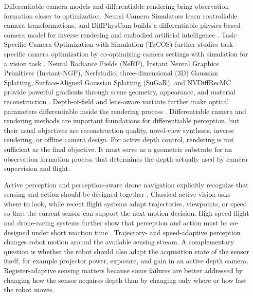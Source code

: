 \documentclass[letterpaper,journal]{IEEEtran}
\begin{document}
Differentiable camera models and differentiable rendering bring observation
formation closer to optimization. Neural Camera Simulators learn controllable
camera transformations, and DiffPhysCam builds a differentiable physics-based
camera model for inverse rendering and embodied artificial intelligence
\cite{ouyangNeuralCameraSimulators2021,chenDiffPhysCamDifferentiablePhysicsBased2025b}.
Task-Specific Camera Optimization with Simulation (TaCOS) further studies
task-specific camera optimization by co-optimizing camera settings with
simulation for a vision task
\cite{yanTaCOS2024}. Neural Radiance Fields (NeRF), Instant Neural Graphics
Primitives (Instant-NGP), Nerfstudio, three-dimensional (3D) Gaussian
Splatting, Surface-Aligned Gaussian Splatting (SuGaR), and NVDiffRecMC provide
powerful gradients through scene geometry, appearance, and material
reconstruction
\cite{mildenhallNeRF2020,mullerInstantNGP2022,tancikNerfstudio2023,kerblGaussianSplatting2023,guedonSuGaR2024,hasselgrenNVDiffRecMC2022}.
Depth-of-field and lens-aware variants further make optical parameters
differentiable inside the rendering process
\cite{pidhorskyiDepthOfField2022,sunCaSENeRF2023,wuDoFNeRF2022,wangNeRFocus2022,kimLensNeRF2024}.
Differentiable camera and rendering methods are important foundations for
differentiable perception, but their usual objectives are reconstruction
quality, novel-view synthesis, inverse rendering, or offline camera design. For
active depth control, rendering is not sufficient as the final objective. It
must serve as a geometric substrate for an observation-formation process that
determines the depth actually used by camera supervision and flight.

Active perception and perception-aware drone navigation explicitly recognize that
sensing and action should be designed together
\cite{bajcsy1988active,aloimonos1988active,revisitingactiveperception,florenceIntegratedPerceptionControl2020,songLearningPerceptionAwareAgile2023,tordesillasDeepPANTHERLearningBasedPerceptionAware2023,zhaoLearningSpeedAdaptation2024a,huSeeingPixelMotion2025}.
Classical active vision asks where to look, while recent flight systems adapt
trajectories, viewpoints, or speed so that the current sensor can support the
next motion decision. High-speed flight and drone-racing systems further show
that perception and action must be co-designed under short reaction time
\cite{loquercioDeepDroneRacing2018,loquercioLearningHighSpeed2021,foehnAgilicious2022,kaufmannChampionLevelDroneRacing2023}.
Trajectory- and speed-adaptive perception changes robot motion around the
available sensing stream. A complementary question is whether the robot should
also adapt the acquisition state of the sensor itself, for example projector
power, exposure, and gain in an active depth camera. Register-adaptive sensing
matters because some failures are better addressed by changing how the sensor
acquires depth than by changing only where or how fast the robot moves.
\end{document}
